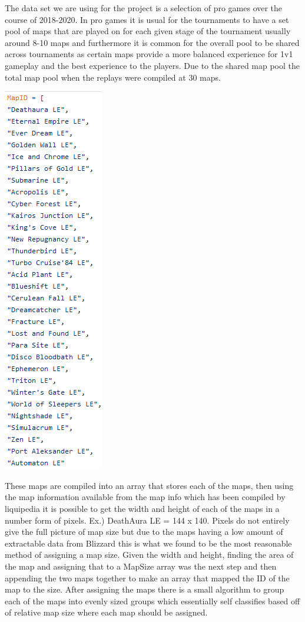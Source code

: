 \documentclass[a4paper,12pt]{report}
\begin{document}
The data set we are using for the project is a selection of pro games over the course of 2018-2020. In pro games it is usual for the tournaments to have a set pool of maps that are played on for each given stage of the tournament usually around 8-10 maps and furthermore it is common for the overall pool to be shared across tournaments as certain maps provide a more balanced experience for 1v1 gameplay and the best experience to the players. Due to the shared map pool the total map pool when the replays were compiled at 30 maps.

\begin{center}
    \captionsetup{type=figure}
    \includegraphics[width=.2\linewidth]{media/MapList.png}
\end{center}

These maps are compiled into an array that stores each of the maps, then using the map information available from the map info which has been compiled by liquipedia it is possible to get the width and height of each of the maps in a number form of pixels. Ex.) DeathAura LE = 144 x 140. Pixels do not entirely give the full picture of map size but due to the maps having a low amount of extractable data from Blizzard this is what we found to be the most reasonable method of assigning a map size. Given the width and height, finding the area of the map and assigning that to a MapSize array was the next step and then appending the two maps together to make an array that mapped the ID of the map to the size. After assigning the maps there is a small algorithm to group each of the maps into evenly sized groups which essentially self classifies based off of relative map size where each map should be assigned.
\end{document}
